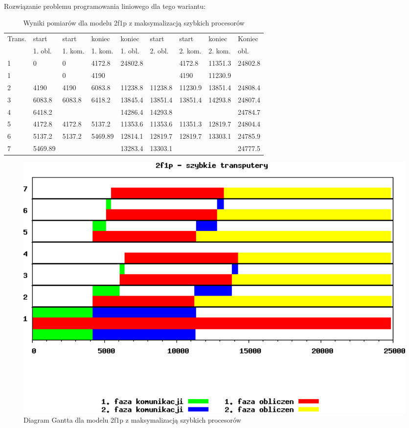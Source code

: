 \documentclass[a4paper,11pt, titlepage]{article}
\begin{document}
Rozwiązanie problemu programowania liniowego dla tego wariantu:
\begin{table}[hp!]
\begin{tabular}{|l|l|l|l|l|l|l|l|l|}\hline
Trans.	&start &start &koniec &koniec &start &start	&koniec	&Koniec\\
&1. obl. &1. kom. &1. kom. &1. obl. &2. obl. &2. kom.	&2.	kom. &obl.\\ \hline
1	&0			&0		&4172.8		&24802.8	&			&4172.8		&11351.3	&24802.8\\ \hline
1	&			&0		&4190		&			&			&4190		&11230.9	&\\ \hline
2	&4190		&4190	&6083.8		&11238.8	&11238.8	&11230.9	&13851.4	&24808.4\\ \hline
3	&6083.8		&6083.8	&6418.2		&13845.4	&13851.4	&13851.4	&14293.8	&24807.4\\ \hline
4	&6418.2		&		&			&14286.4	&14293.8	&			&			&24784.7\\ \hline
5	&4172.8		&4172.8	&5137.2		&11353.6	&11353.6	&11351.3	&12819.7	&24804.4\\ \hline
6	&5137.2		&5137.2	&5469.89	&12814.1	&12819.7	&12819.7	&13303.1	&24785.9\\ \hline
7	&5469.89	&		&			&13283.4	&13303.1	&			&			&24777.5\\ \hline
\end{tabular}
\caption{Wyniki pomiarów dla modelu 2f1p z maksymalizacją szybkich procesorów \label{2f1p_pt}}
\end{table}

\begin{figure}[p!]
\includegraphics[width=1.0\textwidth]{wykresy/1p2f_proc}
\caption{Diagram Gantta dla modelu 2f1p z maksymalizacją szybkich procesorów \label{1p2f_p}}
\end{figure}
\end{document}
